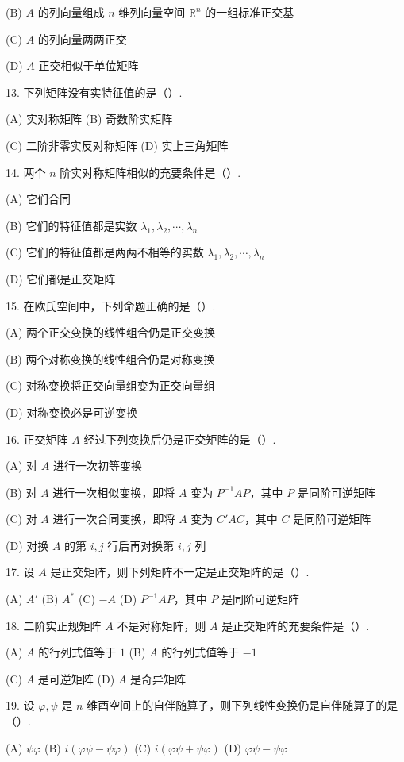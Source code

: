 \documentclass[UTF8,12pt,a4paper,fontset=fandol]{ctexart}
\begin{document}
(B) $A$ 的列向量组成 $n$ 维列向量空间 $\mathbb{R}^n$ 的一组标准正交基

(C) $A$ 的列向量两两正交

(D) $A$ 正交相似于单位矩阵

13. 下列矩阵没有实特征值的是（\quad ）.

(A) 实对称矩阵 \qquad (B) 奇数阶实矩阵

(C) 二阶非零实反对称矩阵 \qquad (D) 实上三角矩阵

14. 两个 $n$ 阶实对称矩阵相似的充要条件是（\quad ）.

(A) 它们合同

(B) 它们的特征值都是实数 $\lambda_1,\lambda_2,\cdots,\lambda_n$

(C) 它们的特征值都是两两不相等的实数 $\lambda_1,\lambda_2,\cdots,\lambda_n$

(D) 它们都是正交矩阵

15. 在欧氏空间中，下列命题正确的是（\quad ）.

(A) 两个正交变换的线性组合仍是正交变换

(B) 两个对称变换的线性组合仍是对称变换

(C) 对称变换将正交向量组变为正交向量组

(D) 对称变换必是可逆变换

16. 正交矩阵 $A$ 经过下列变换后仍是正交矩阵的是（\quad ）.

(A) 对 $A$ 进行一次初等变换

(B) 对 $A$ 进行一次相似变换，即将 $A$ 变为 $P^{-1}AP$，其中 $P$ 是同阶可逆矩阵

(C) 对 $A$ 进行一次合同变换，即将 $A$ 变为 $C'AC$，其中 $C$ 是同阶可逆矩阵

(D) 对换 $A$ 的第 $i,j$ 行后再对换第 $i,j$ 列

17. 设 $A$ 是正交矩阵，则下列矩阵不一定是正交矩阵的是（\quad ）.

(A) $A'$ \qquad (B) $A^*$ \qquad (C) $-A$ \qquad (D) $P^{-1}AP$，其中 $P$ 是同阶可逆矩阵

18. 二阶实正规矩阵 $A$ 不是对称矩阵，则 $A$ 是正交矩阵的充要条件是（\quad ）.

(A) $A$ 的行列式值等于 $1$ \qquad (B) $A$ 的行列式值等于 $-1$

(C) $A$ 是可逆矩阵 \qquad (D) $A$ 是奇异矩阵

19. 设 $\varphi,\psi$ 是 $n$ 维酉空间上的自伴随算子，则下列线性变换仍是自伴随算子的是（\quad ）.

(A) $\psi\varphi$ \qquad (B) $i(\varphi\psi-\psi\varphi)$ \qquad (C) $i(\varphi\psi+\psi\varphi)$ \qquad (D) $\varphi\psi-\psi\varphi$
\end{document}
